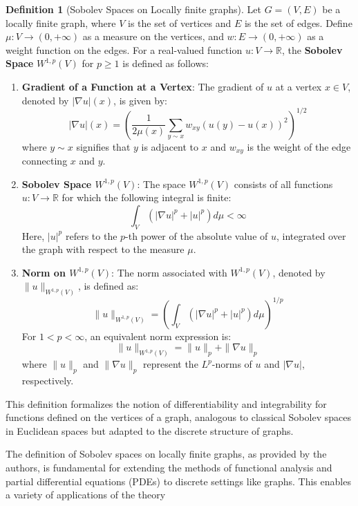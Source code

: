 \documentclass[11pt,a4paper]{article}
\theoremstyle{plain}
\theoremstyle{definition}
\newtheorem{definition}[theorem]{Definition}
\theoremstyle{remark}
\begin{document}
\begin{definition}[Sobolev Spaces on Locally finite graphs]
Let \(G = (V, E)\) be a locally finite graph, where \(V\) is the set of vertices and \(E\) is the set of edges. Define \(\mu : V \rightarrow (0, +\infty)\) as a measure on the vertices, and \(w: E \rightarrow (0, +\infty)\) as a weight function on the edges. For a real-valued function \(u: V \rightarrow \mathbb{R}\), the \textbf{Sobolev Space}  \(W^{1,p}(V)\) for \(p \geq 1\) is defined as follows:
\begin{enumerate}
    \item \textbf{Gradient of a Function at a Vertex}:
    The gradient of \(u\) at a vertex \(x \in V\), denoted by \(|\nabla u|(x)\), is given by:
    \[
    |\nabla u|(x) = \left( \frac{1}{2\mu(x)} \sum_{y \sim x} w_{xy}(u(y) - u(x))^2 \right)^{1/2}
    \]
    where \(y \sim x\) signifies that \(y\) is adjacent to \(x\) and \(w_{xy}\) is the weight of the edge connecting \(x\) and \(y\).

    \item \textbf{Sobolev Space \(W^{1,p}(V)\)}:
    The space \(W^{1,p}(V)\) consists of all functions \(u: V \rightarrow \mathbb{R}\) for which the following integral is finite:
    \[
    \int_V (|\nabla u|^p + |u|^p) d\mu < \infty
    \]
    Here, \(|u|^p\) refers to the \(p\)-th power of the absolute value of \(u\), integrated over the graph with respect to the measure \(\mu\).

    \item \textbf{Norm on \(W^{1,p}(V)\)}:
    The norm associated with \(W^{1,p}(V)\), denoted by \(\|u\|_{W^{1,p}(V)}\), is defined as:
    \[
    \|u\|_{W^{1,p}(V)} = \left(\int_V (|\nabla u|^p + |u|^p) d\mu\right)^{1/p}
    \]
    For \(1 < p < \infty\), an equivalent norm expression is:
    \[
    \|u\|_{W^{1,p}(V)} = \|u\|_p + \|\nabla u\|_p
    \]
    where \(\|u\|_p\) and \(\|\nabla u\|_p\) represent the \(L^p\)-norms of \(u\) and \(|\nabla u|\), respectively.
\end{enumerate}

This definition formalizes the notion of differentiability and integrability for functions defined on the vertices of a graph, analogous to classical Sobolev spaces in Euclidean spaces but adapted to the discrete structure of graphs.

\end{definition}

The definition of Sobolev spaces on locally finite graphs, as provided by the authors, is fundamental for extending the methods of functional analysis and partial differential equations (PDEs) to discrete settings like graphs. This enables a variety of applications of the theory
\end{document}
